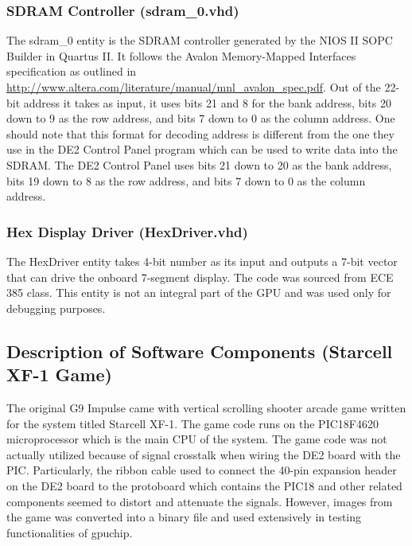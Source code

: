 \documentclass{report}
\begin{document}
\subsubsection{SDRAM Controller (sdram\_0.vhd)}
The sdram\_0 entity is the SDRAM controller generated by the NIOS II 
SOPC Builder in Quartus II. It follows the Avalon Memory-Mapped 
Interfaces specification as outlined in 
\url{http://www.altera.com/literature/manual/mnl\_avalon\_spec.pdf}. Out 
of the 22-bit address it takes as input, it uses bits 21 and 8 for the 
bank address, bits 20 down to 9 as the row address, and bits 7 down to 0 
as the column address. One should note that this format for decoding 
address is different from the one they use in the DE2 Control Panel 
program which can be used to write data into the SDRAM. The DE2 Control 
Panel uses bits 21 down to 20 as the bank address, bits 19 down to 8 as 
the row address, and bits 7 down to 0 as the column address.

\subsubsection{Hex Display Driver (HexDriver.vhd)}
The HexDriver entity takes 4-bit number as its input and outputs a 7-bit 
vector that can drive the onboard 7-segment display. The code was 
sourced from ECE 385 class. This entity is not an integral part of the 
GPU and was used only for debugging purposes.

\subsection{Description of Software Components (Starcell XF-1 Game)}
The original G9 Impulse came with vertical scrolling shooter arcade game 
written for the system titled Starcell XF-1. The game code runs on the 
PIC18F4620 microprocessor which is the main CPU of the system. The game 
code was not actually utilized because of signal crosstalk when wiring 
the DE2 board with the PIC. Particularly, the ribbon cable used to 
connect the 40-pin expansion header on the DE2 board to the protoboard 
which contains the PIC18 and other related components seemed to distort 
and attenuate the signals. However, images from the game was converted 
into a binary file and used extensively in testing functionalities of 
gpuchip.

\newpage
\end{document}
